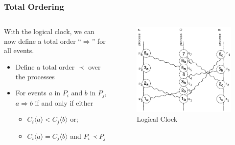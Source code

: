 \documentclass{beamer}
\begin{document}
\frame
{
	\frametitle{Total Ordering}
	\begin{columns}
	\begin{column}{0.6\textwidth}


		With the logical clock, we can now define a total order ``$\Rightarrow$'' for all events.

		\begin{itemize}
			\item<2-> Define a total order $\prec$ over the processes
			\item<3-> For events $a$ in $P_i$ and $b$ in $P_j$, $a\Rightarrow b$ if and only if either
				\begin{itemize}
					\item $C_i\langle a\rangle < C_j\langle b\rangle$ or;
					\item $C_i\langle a\rangle = C_j\langle b\rangle$ and $P_i\prec P_j$
				\end{itemize}
		\end{itemize}

	\end{column}
	\begin{column}{0.4\textwidth}

		\begin{figure}[ht!]
		\includegraphics[width=\textwidth]{files/ClockDist-Total-Order.png}
		\caption{Logical Clock}
		\end{figure}


	\end{column}
	\end{columns}
}
\end{document}
